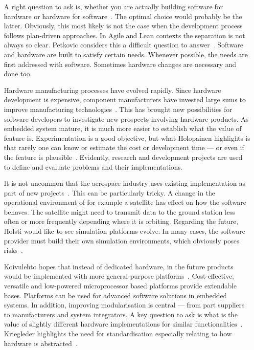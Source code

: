 \documentclass[english]{tktltiki2}
\begin{document}
A right question to ask is, whether you are actually building software for hardware or hardware for software~\cite{BT15}. The optimal choice would probably be the latter. Obviously, this most likely is not the case when the development process follows plan-driven approaches. In Agile and Lean contexts the separation is not always so clear. Petkovic considers this a difficult question to answer~\cite{Pet15}. Software and hardware are built to satisfy certain needs. Whenever possible, the needs are first addressed with software. Sometimes hardware changes are necessary and done too.

Hardware manufacturing processes have evolved rapidly. Since hardware development is expensive, component manufacturers have invested large sums to improve manufacturing technologies~\cite{Hol15a}. This has brought new possibilities for software developers to investigate new prospects involving hardware products. As embedded system mature, it is much more easier to establish what the value of feature is. Experimentation is a good objective, but what Holopainen highlights is that rarely one can know or estimate the cost or development time — or even if the feature is plausible~\cite{Hol15a}. Evidently, research and development projects are used to define and evaluate problems and their implementations.

It is not uncommon that the aerospace industry uses existing implementation as part of new projects~\cite{Hol15b}. This can be particularly tricky. A change in the operational environment of for example a satellite has effect on how the software behaves. The satellite might need to transmit data to the ground station less often or more frequently depending where it is orbiting. Regarding the future, Holsti would like to see simulation platforms evolve. In many cases, the software provider must build their own simulation environments, which obviously poses risks~\cite{Hol15b}.

Koivulehto hopes that instead of dedicated hardware, in the future products would be implemented with more general-purpose platforms~\cite{Koi15}. Cost-effective, versatile and low-powered microprocessor based platforms provide extendable bases. Platforms can be used for advanced software solutions in embedded systems. In addition, improving modularisation is central — from part suppliers to manufacturers and system integrators. A key question to ask is what is the value of slightly different hardware implementations for similar functionalities~\cite{Koi15}. Kriegleder highlights the need for standardisation especially relating to how hardware is abstracted~\cite{Kri15}.
\end{document}
